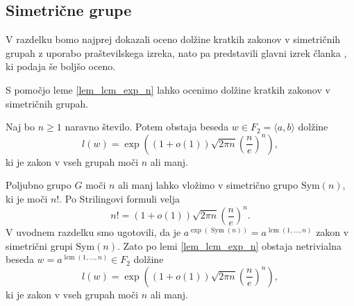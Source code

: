 \subsection{Simetrične grupe}\label{sec_simetricne_grupe}

V razdelku bomo najprej dokazali oceno dolžine kratkih zakonov v simetričnih grupah z uporabo praštevilskega izreka, nato pa predstavili glavni izrek članka \cite{Kozma_Thom_2016}, ki podaja še boljšo oceno.

S pomočjo leme \ref{lem_lcm_exp_n} lahko ocenimo dolžine kratkih zakonov v simetričnih grupah.

\begin{posledica}
\label{psl_zakon_v_splosni_grupi_prastevilski}
Naj bo $n \ge 1$ naravno število. Potem obstaja beseda $w \in F_2 = \langle  a, b \rangle$ dolžine \begin{equation*}
    l(w) = \exp\left((1+ o(1)) \sqrt{2 \pi n} \left( \frac{n}{e} \right)^n\right),
\end{equation*}
ki je zakon v vseh grupah moči $n$ ali manj. 
\end{posledica}
\begin{dokaz}
Poljubno grupo $G$ moči $n$ ali manj lahko vložimo v simetrično grupo $\text{Sym}(n)$, ki je moči $n!$. Po Strilingovi formuli velja \begin{equation*}
    n! =  (1+ o(1)) \sqrt{2 \pi n} \left( \frac{n}{e} \right)^n.
\end{equation*}  
V uvodnem razdelku smo ugotovili, da je $a^{\exp(\operatorname{Sym}(n))} = a^{\operatorname{lcm}(1, \ldots, n)}$ zakon v simetrični grupi $\text{Sym}(n)$.
Zato po lemi \ref{lem_lcm_exp_n} obstaja netrivialna beseda $w = a^{\operatorname{lcm}(1, \ldots, n)} \in F_2$ dolžine
\begin{equation*}
l(w) = \exp\left((1+ o(1)) \sqrt{2 \pi n} \left( \frac{n}{e} \right)^n\right),
\end{equation*}  
  ki je zakon v vseh grupah moči $n$ ali manj. 
\end{dokaz}



